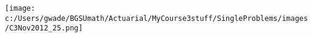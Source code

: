 
\texttt{[image: c:/Users/gwade/BGSUmath/Actuarial/MyCourse3stuff/SingleProblems/images/C3Nov2012\_25.png]}


\showsol{\bsoln

\esoln}
